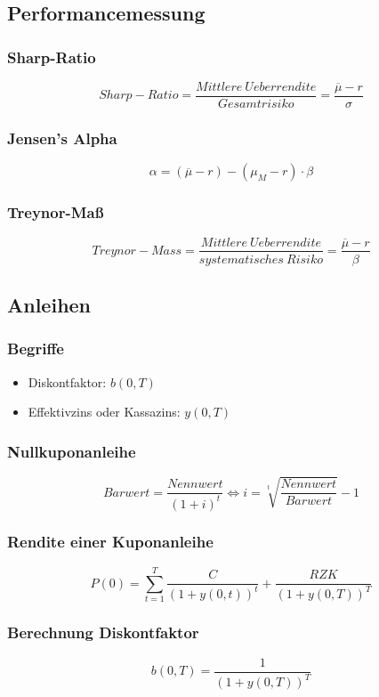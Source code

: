 \subsection{Performancemessung}

\subsubsection{Sharp-Ratio}
\[Sharp-Ratio = \frac{Mittlere~Ueberrendite}{Gesamtrisiko} = \frac{\overline{\mu} - r}{\sigma}\]

\subsubsection{Jensen's Alpha}
\[\alpha = (\overline{\mu} - r) - (\mu_M - r) \cdot \beta\]

\subsubsection{Treynor-Maß}
\[Treynor-Mass = \frac{Mittlere~Ueberrendite}{systematisches~Risiko} = \frac{\overline{\mu} - r}{\beta}\]


\subsection{Anleihen}

\subsubsection{Begriffe}
\begin{itemize}
	\item Diskontfaktor: \(b(0,T)\)
	\item Effektivzins oder Kassazins: \(y(0,T)\)
\end{itemize}

\subsubsection{Nullkuponanleihe}
\[Barwert = \frac{Nennwert}{(1+i)^t} \iff i = \sqrt[t]{\frac{Nennwert}{Barwert}} -1\]

\subsubsection{Rendite einer Kuponanleihe}
\[P(0) = \sum_{t=1}^{T} \frac{C}{(1+y(0,t))^t} + \frac{RZK}{(1+y(0,T))^T}\]

\subsubsection{Berechnung Diskontfaktor}
\[b(0,T) = \frac{1}{(1+y(0,T))^T}\]

